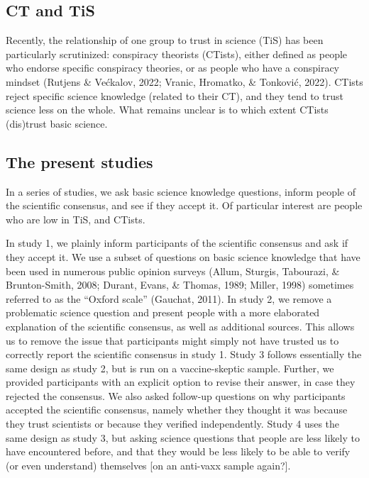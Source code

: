\documentclass[
  doc,floatsintext]{apa6}
\begin{document}
\subsection{CT and TiS}\label{ct-and-tis}

Recently, the relationship of one group to trust in science (TiS) has been particularly scrutinized: conspiracy theorists (CTists), either defined as people who endorse specific conspiracy theories, or as people who have a conspiracy mindset (Rutjens \& Većkalov, 2022; Vranic, Hromatko, \& Tonković, 2022). CTists reject specific science knowledge (related to their CT), and they tend to trust science less on the whole. What remains unclear is to which extent CTists (dis)trust basic science.

\subsection{The present studies}\label{the-present-studies}

In a series of studies, we ask basic science knowledge questions, inform people of the scientific consensus, and see if they accept it. Of particular interest are people who are low in TiS, and CTists.

In study 1, we plainly inform participants of the scientific consensus and ask if they accept it. We use a subset of questions on basic science knowledge that have been used in numerous public opinion surveys (Allum, Sturgis, Tabourazi, \& Brunton-Smith, 2008; Durant, Evans, \& Thomas, 1989; Miller, 1998) sometimes referred to as the ``Oxford scale'' (Gauchat, 2011). In study 2, we remove a problematic science question and present people with a more elaborated explanation of the scientific consensus, as well as additional sources. This allows us to remove the issue that participants might simply not have trusted us to correctly report the scientific consensus in study 1. Study 3 follows essentially the same design as study 2, but is run on a vaccine-skeptic sample. Further, we provided participants with an explicit option to revise their answer, in case they rejected the consensus. We also asked follow-up questions on why participants accepted the scientific consensus, namely whether they thought it was because they trust scientists or because they verified independently. Study 4 uses the same design as study 3, but asking science questions that people are less likely to have encountered before, and that they would be less likely to be able to verify (or even understand) themselves {[}on an anti-vaxx sample again?{]}.
\end{document}
